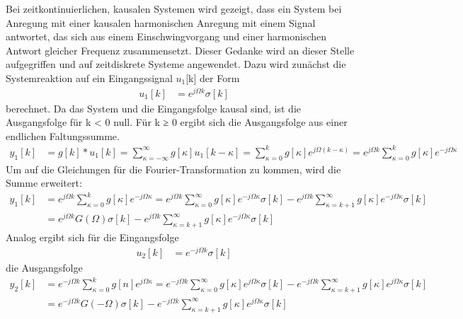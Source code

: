 Bei zeitkontinuierlichen, kausalen Systemen wird gezeigt, dass ein System bei Anregung mit einer kausalen harmonischen Anregung mit einem Signal antwortet, das sich aus einem Einschwingvorgang und einer harmonischen Antwort gleicher Frequenz zusammensetzt. Dieser Gedanke wird an dieser Stelle aufgegriffen und auf zeitdiskrete Systeme angewendet. Dazu wird zunächst die Systemreaktion auf ein Eingangssignal \(u_{1}\){[}k{]} der Form
\begin{align}
u_{1}[ k] &= e^{j  \Omega  k}  \sigma[ k] \label{eq:8.18}
\end{align}
berechnet. Da das System und die Eingangsfolge kausal sind, ist die Ausgangsfolge für k \textless{} 0 null. Für k ≥ 0 ergibt sich die Ausgangsfolge aus einer endlichen Faltungssumme.
\begin{align}
y_{1}[ k] &= g[ k]*u_{1}[ k] = \sum\limits_{\kappa = - \infty}^{\infty}{g[\kappa]}  u_{1}[ k - \kappa] = \sum\limits_{\kappa = 0}^{k}{g[\kappa]}  e^{j  \Omega  (k - \kappa)} = e^{j  \Omega  k}  \sum\limits_{\kappa = 0}^{k}{g[\kappa]}  e^{- j  \Omega  \kappa} \label{eq:8.19}
\end{align}
Um auf die Gleichungen für die Fourier-Transformation zu kommen, wird die Summe erweitert:
\begin{align}
{y_{1} \left[k\right]} &=  {e^{j \Omega  k}  \sum\limits _{\kappa =0}^{k}g\left[\kappa \right]  e^{-j \Omega  \kappa } =e^{j \Omega  k}  \sum\limits _{\kappa =0}^{\infty }g\left[\kappa \right]  e^{-j \Omega  \kappa }  \sigma \left[k\right]-e^{j \Omega  k}  \sum\limits _{\kappa =k+1}^{\infty }g\left[\kappa \right]  e^{-j \Omega  \kappa }  \sigma \left[k\right]} \\
{} &=  {e^{j \Omega  k}  G\left(\Omega \right) \sigma \left[k\right]-e^{j \Omega  k}  \sum\limits _{\kappa =k+1}^{\infty }g\left[\kappa \right]  e^{-j \Omega  \kappa }  \sigma \left[k\right]}
\label{eq:8.20}
\end{align}
Analog ergibt sich für die Eingangsfolge
\begin{align}
u_{2}[ k] &= e^{- j  \Omega  k}  \sigma[ k] \label{eq:8.21}
\end{align}
die Ausgangsfolge
\begin{align}
{y_{2} \left[k\right]} &=  {e^{-j \Omega  k}  \sum\limits _{\kappa =0}^{k}g\left[n\right]  e^{j \Omega  \kappa } =e^{-j \Omega  k}  \sum\limits _{\kappa =0}^{\infty }g\left[\kappa \right]  e^{j \Omega  \kappa }  \sigma \left[k\right]-e^{-j \Omega  k}  \sum\limits _{\kappa =k+1}^{\infty }g\left[\kappa \right]  e^{j \Omega  \kappa }  \sigma \left[k\right]} \\
{} &=  {e^{-j \Omega  k}  G\left(-\Omega \right) \sigma \left[k\right]-e^{-j \Omega  k}  \sum\limits _{\kappa =k+1}^{\infty }g\left[\kappa \right]  e^{j \Omega  \kappa }  \sigma \left[k\right]}
\label{eq:8.22}
\end{align}
